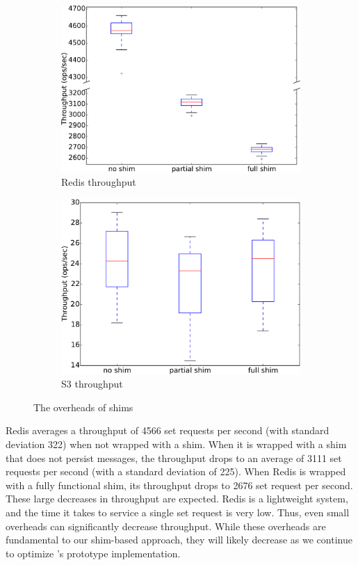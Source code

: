 \begin{figure}[ht]
  \centering
  \begin{subfigure}[b]{\columnwidth}
    \centering
    \includegraphics[width=0.8\columnwidth]{figures/redis_shim.pdf}
    \caption{Redis throughput}
  \end{subfigure}

  \begin{subfigure}[b]{\columnwidth}
    \centering
    \includegraphics[width=0.8\columnwidth]{figures/s3_shim.pdf}
    \caption{S3 throughput}
  \end{subfigure}%
  \caption{The overheads of \fluent{} shims}
\end{figure}

Redis averages a throughput of 4566 set requests per second (with standard
deviation 322) when not wrapped with a \fluent{} shim. When it is wrapped with
a \fluent{} shim that does not persist messages, the throughput drops to an
average of 3111 set requests per second (with a standard deviation of 225).
When Redis is wrapped with a fully functional shim, its throughput drops to
2676 set request per second. These large decreases in throughput are expected.
Redis is a lightweight system, and the time it takes to service a single set
request is very low. Thus, even small overheads can significantly decrease
throughput.  While these overheads are fundamental to our shim-based approach,
they will likely decrease as we continue to optimize \fluent{}'s prototype
implementation.

